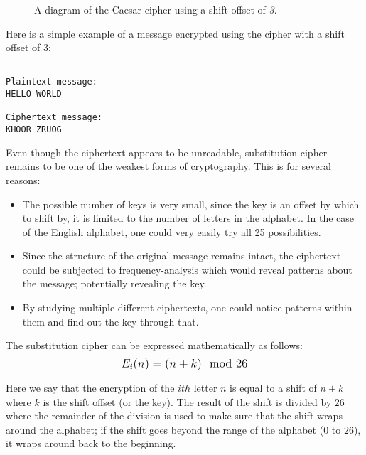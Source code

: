 \begin{figure}[H]
    \caption{A diagram of the Caesar cipher using a shift offset of \textit{3}.}
\end{figure}

Here is a simple example of a message encrypted using the cipher with a shift offset of 3:

\begin{verbatim}

Plaintext message: 
HELLO WORLD
               
Ciphertext message:
KHOOR ZRUOG
\end{verbatim}

Even though the ciphertext appears to be unreadable, substitution cipher remains to be one of the weakest forms of cryptography. 
This is for several reasons:
\begin{itemize}  
    \item The possible number of keys is very small, since the key is an offset by which to shift by, it is limited to the number of letters in the alphabet.
    In the case of the English alphabet, one could very easily try all 25 possibilities. 
    \item Since the structure of the original message remains intact, the ciphertext could be subjected to frequency-analysis which would reveal patterns about the message;
    potentially revealing the key.
    \item By studying multiple different ciphertexts, one could notice patterns within them and find out the key through that.
\end{itemize}

The substitution cipher can be expressed mathematically as follows: $$\mathlarger{E_i(n)=(n+k)\mod{26}}$$

Here we say that the encryption of the $ith$ letter $n$ is equal to a shift of $n+k$ where $k$ is the shift offset (or the key). The result of the shift
is divided by $26$ where the remainder of the division is used to make sure that the shift wraps around the alphabet; if the 
shift goes beyond the range of the alphabet ($0$ to $26$), it wraps around back to the beginning.

